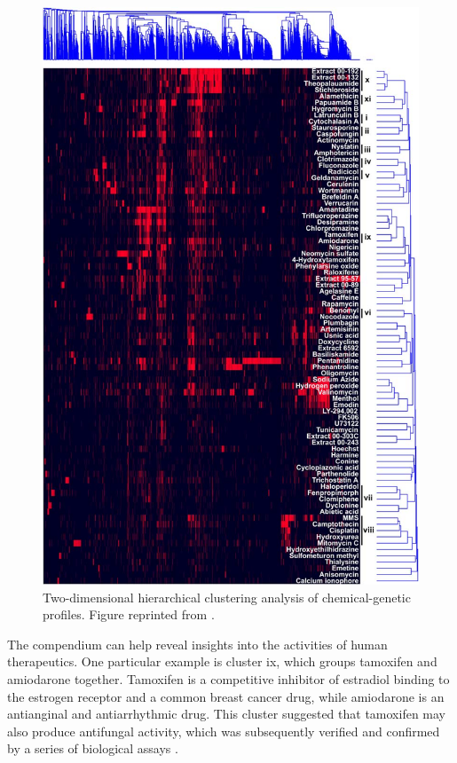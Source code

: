 \documentclass[12pt,fullpage,singlespace]{article}
\begin{document}
\begin{figure}
\centering
\includegraphics[width=\linewidth]{1078-1.png}
\caption{Two-dimensional hierarchical clustering analysis of chemical-genetic profiles. Figure reprinted from \citep{1078}.}
\label{fig:1078-1}
\end{figure}

The compendium can help reveal insights into the activities of human therapeutics. One particular example is cluster ix, which groups tamoxifen and amiodarone together. Tamoxifen is a competitive inhibitor of estradiol binding to the estrogen receptor and a common breast cancer drug, while amiodarone is an antianginal and antiarrhythmic drug. This cluster suggested that tamoxifen may also produce antifungal activity, which was subsequently verified and confirmed by a series of biological assays \citep{1078}.
\end{document}

